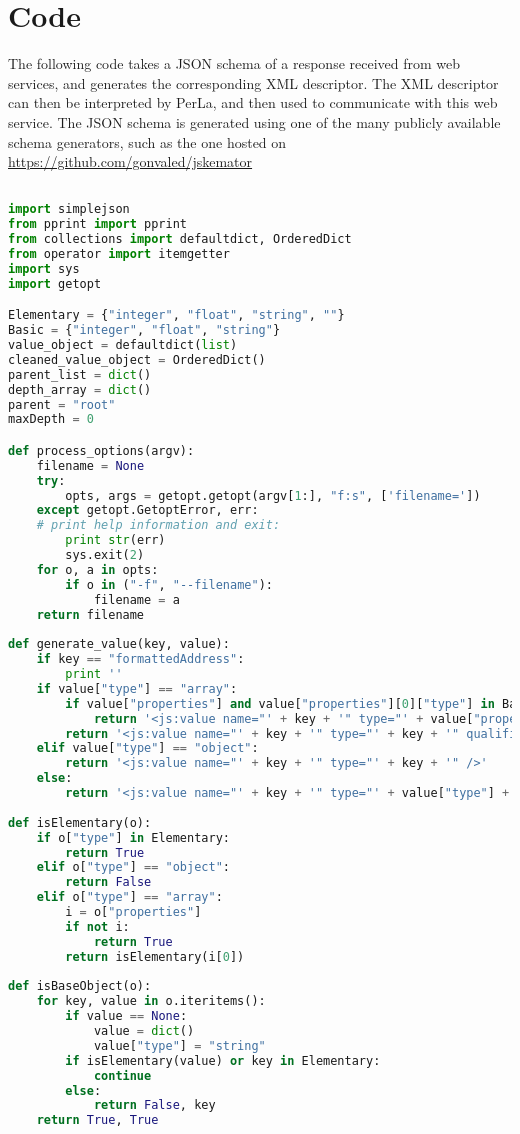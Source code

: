 \chapter{Code}
\label{appendiceA}
\thispagestyle{empty}
The following code takes a JSON schema of a response received from web services, and generates the corresponding XML descriptor. The XML descriptor can then be interpreted by PerLa, and then used to communicate with this web service. The JSON schema is generated using one of the many publicly available schema generators, such as the one hosted on \hyperref[https://github.com/gonvaled/jskemator]{https://github.com/gonvaled/jskemator}\\
\begin{lstlisting}[language=Python]

import simplejson
from pprint import pprint
from collections import defaultdict, OrderedDict
from operator import itemgetter
import sys
import getopt

Elementary = {"integer", "float", "string", ""}
Basic = {"integer", "float", "string"}
value_object = defaultdict(list)
cleaned_value_object = OrderedDict()
parent_list = dict()
depth_array = dict()
parent = "root"
maxDepth = 0

def process_options(argv):
	filename = None
	try:
		opts, args = getopt.getopt(argv[1:], "f:s", ['filename='])
	except getopt.GetoptError, err:
	# print help information and exit:
		print str(err)
		sys.exit(2)
	for o, a in opts:
		if o in ("-f", "--filename"):
			filename = a
	return filename
	
def generate_value(key, value):
	if key == "formattedAddress":
		print ''
	if value["type"] == "array":
		if value["properties"] and value["properties"][0]["type"] in Basic:
			return '<js:value name="' + key + '" type="' + value["properties"][0]["type"] + '" qualifier="list" />'
		return '<js:value name="' + key + '" type="' + key + '" qualifier="list" />'
	elif value["type"] == "object":
		return '<js:value name="' + key + '" type="' + key + '" />'
	else:
		return '<js:value name="' + key + '" type="' + value["type"] + '" />'
		
def isElementary(o):
	if o["type"] in Elementary:
		return True
	elif o["type"] == "object":
		return False
	elif o["type"] == "array":
		i = o["properties"]
		if not i:
			return True
		return isElementary(i[0])
		
def isBaseObject(o):
	for key, value in o.iteritems():
		if value == None:
			value = dict()
			value["type"] = "string"
		if isElementary(value) or key in Elementary:
			continue
		else:
			return False, key
	return True, True


\end{lstlisting}
